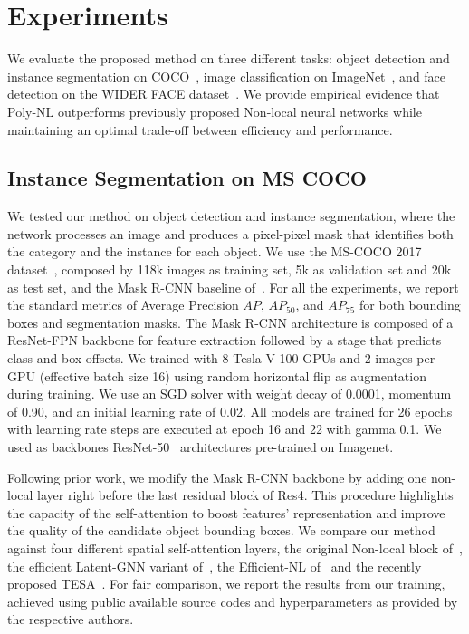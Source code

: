 \documentclass[10pt,twocolumn,letterpaper]{article}
\begin{document}
\section{Experiments}
We evaluate the proposed method on three different tasks: object detection and instance segmentation on COCO~\cite{lin2014microsoft}, image classification on ImageNet~\cite{russakovsky2015imagenet}, and face detection on the WIDER FACE dataset~\cite{yang2016wider}. We provide empirical evidence that Poly-NL outperforms previously proposed Non-local neural networks while maintaining an optimal trade-off between efficiency and performance.

\subsection{Instance Segmentation on MS COCO}
We tested our method on object detection and instance segmentation, where the network processes an image and produces a pixel-pixel mask that identifies both the category and the instance for each object. We use the MS-COCO 2017 dataset~\cite{lin2014microsoft}, composed by 118k images as training set, 5k as validation set and 20k as test set, and the Mask R-CNN baseline of~\cite{he2017mask}. For all the experiments, we report the standard metrics of Average Precision $AP$, $AP_{50}$, and $AP_{75}$ for both bounding boxes and segmentation masks. The Mask R-CNN architecture is composed of a ResNet-FPN backbone for feature extraction followed by a stage that predicts class and box offsets. We trained with 8 Tesla V-100 GPUs and 2 images per GPU (effective batch size 16) using random horizontal flip as augmentation during training. We use an SGD solver with weight decay of 0.0001, momentum of 0.90, and an initial learning rate of 0.02. All models are trained for 26 epochs with learning rate steps are executed at epoch 16 and 22 with gamma 0.1. We used as backbones ResNet-50~\cite{he2016deep} architectures pre-trained on Imagenet.

Following prior work, we modify the Mask R-CNN backbone by adding one non-local layer right before the last residual block of Res4. This procedure highlights the capacity of the self-attention to boost features' representation and improve the quality of the candidate object bounding boxes. We compare our method against four different spatial self-attention layers, the original Non-local block of~\cite{wang2018non}, the efficient Latent-GNN variant of~\cite{zhang2019latentgnn}, the Efficient-NL of~\cite{shen2021efficient} and the recently proposed TESA~\cite{babiloni2020tesa}. For fair comparison, we report the results from our training, achieved using public available source codes and hyperparameters as provided by the respective authors. 
\end{document}
